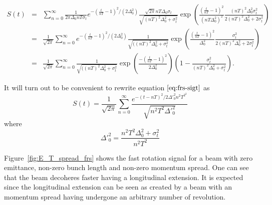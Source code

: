 {\small
\begin{eqnarray}
S(t)&=&\sum_{n=0}^\infty\frac{1}{2\pi\Delta_0nT\sigma_t}e^{-(\frac{t}{nT}-1)^2/(2\Delta_0^2)}
\frac{\sqrt{2\pi}nT\Delta_0\sigma_t}{\sqrt{(nT)^2\Delta_0^2+\sigma_t^2}}
\exp(\frac{(\frac{t}{nT}-1)^2}{(nT\Delta_0^2)^2}\frac{(nT)^2\Delta_0^2\sigma_t^2}{2(nT)^2\Delta_0^2+2\sigma_t^2})\nonumber\\
&=& \frac{1}{\sqrt{2\pi}}\sum_{n=0}^\infty e^{-(\frac{t}{nT}-1)^2/(2\Delta_0^2)}
\frac{1}{\sqrt{((nT)^2\Delta_0^2+\sigma_t^2}}
\exp(\frac{(\frac{t}{nT}-1)^2}{\Delta_0^2}\frac{\sigma_t^2}{2(nT)^2\Delta_0^2+2\sigma_t^2})\nonumber\\
&=& \frac{1}{\sqrt{2\pi}}\sum_{n=0}^\infty
\frac{1}{\sqrt{((nT)^2\Delta_0^2+\sigma_t^2}}
\exp\left(\frac{-(\frac{t}{nT}-1)^2}{2\Delta_0^2}\right)\left(1-\frac{\sigma_t^2}{(nT)^2\Delta_0^2+\sigma_t^2}\right).\label{eq:frs-sigt}
\end{eqnarray}
}

It will turn out to be convenient to rewrite equation$~\eqref{eq:frs-sigt}$ as 
\begin{equation}
S(t)=\frac{1}{\sqrt{2\pi}}\sum^{\infty}_{n=0}\frac{e^{-(t-nT)^2/2\Delta'^2_0n^2T^2^2}}{\sqrt{n^2T^2\Delta'^2_0}}
\label{eq:frs-sigtsimp}
\end{equation}
where \[\Delta'^2_0=\frac{n^2T^2\Delta^2_0+\sigma^2_t}{n^2T^2}\]

Figure~\ref{fig:E_T_spread_frs} shows the fast rotation signal for a beam with zero emittance, non-zero bunch length and non-zero momentum spread.
One can see that the beam decoheres faster having a longitudinal extension. It is expected since the longitudinal extension can be seen as 
created by a beam with an momentum spread having undergone an arbitrary number of revolution.

